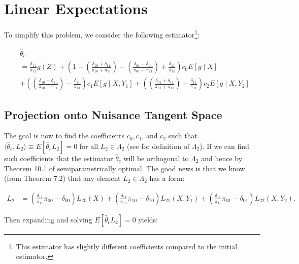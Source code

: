 \documentclass[12pt]{article}
\begin{document}
\appendix

\section{Linear Expectations}

To simplify this problem, we consider the following estimator\footnote{This
estimator has slightly different coefficients compared to the initial
estimator.}:

\begin{align}
  &\hat \theta_c \\ \nonumber
  &= \frac{\delta_{11}}{\pi_{11}} g(Z) + \left(1 -
    \left(\frac{\delta_{10} + \delta_{11}}{\pi_{10} + \pi_{11}}\right) -
    \left(\frac{\delta_{01} + \delta_{11}}{\pi_{01} + \pi_{11}}\right) + 
  \frac{\delta_{11}}{\pi_{11}}\right) c_0 E[g \mid X] \\ \nonumber
  &+
  \left(\left(\frac{\delta_{10} + \delta_{11}}{\pi_{10} + \pi_{11}}\right) - 
  \frac{\delta_{11}}{\pi_{11}}\right) c_1 E[g \mid X, Y_1] +
  \left(\left(\frac{\delta_{01} + \delta_{11}}{\pi_{01} + \pi_{11}}\right) - 
  \frac{\delta_{11}}{\pi_{11}}\right) c_2 E[g \mid X, Y_2]
\end{align}

\subsection{Projection onto Nuisance Tangent Space}

The goal is now to find the coefficients $c_0, c_1$, and $c_2$ such that 
$\langle \hat \theta_c, L_2\rangle \equiv E[\hat \theta_c L_2] = 0$ for 
all $L_2 \in \Lambda_2$ (see \cite{tsiatis2006semiparametric} for definition 
of $\Lambda_2$). If we can find such coefficients that the estimator $\hat
\theta_c$ will be orthogonal to $\Lambda_2$ and hence by Theorem 10.1 of 
\cite{tsiatis2006semiparametric} semiparametrically optimal. The good news 
is that we know (from Theorem 7.2) that any element $L_2 \in \Lambda_2$ has a
form:

\begin{align}
  L_2 &= 
  \left(\frac{\delta_{11}}{\pi_{11}}\pi_{00} - \delta_{00}\right) L_{20}(X) +
  \left(\frac{\delta_{11}}{\pi_{11}}\pi_{10} - \delta_{10}\right) L_{21}(X, Y_1) +
  \left(\frac{\delta_{11}}{\pi_{11}}\pi_{01} - \delta_{01}\right) L_{22}(X, Y_2).
\end{align}

Then expanding and solving $E[\hat \theta_c L_2] = 0$ yields:
\end{document}
